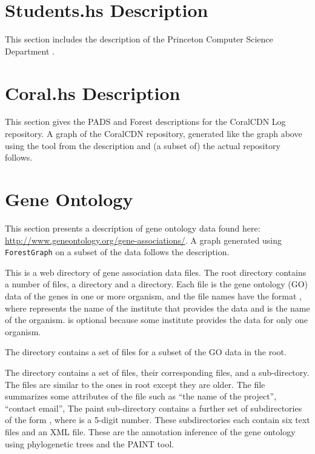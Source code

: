 \section{Students.hs Description}
This section includes the \forest{} description of the Princeton
Computer Science Department \filestore{}.


\newpage

\section{Coral.hs Description}

This section gives the PADS and Forest descriptions for the CoralCDN
Log repository. A graph of the CoralCDN
repository, generated like the graph above using the 
tool from the description and (a subset of) the actual repository 
follows.



\newpage

\section{Gene Ontology}

This section presents a description of gene ontology data found 
here: \url{http://www.geneontology.org/gene-associations/}.
A graph generated using \texttt{ForestGraph}
on a subset of the data follows the description.

This \filestore{} is a web directory of gene association data files.
The root directory contains a number of  files,
a  directory and a  directory.
Each  file is the gene ontology (GO) data of the genes
in one or more organism, and the file names have the format
, where  represents the
name of the institute that provides the data and  is the
name of the organism.  is optional because some institute
provides the data for only one organism.

The  directory contains a set of  files for a
subset of the GO data in the root.

The  directory contains a set of  files, their
corresponding  files, and a  sub-directory.
The  files are similar to the ones
in root except they are older. The  file summarizes
some attributes of the  file such as ``the name of the project'',
``contact email'', \etc{} The paint sub-directory contains
a further set of subdirectories of the form , where
 is a 5-digit number. These subdirectories each contain
six text files and an XML file. These are the annotation inference
of the gene ontology using phylogenetic trees and the PAINT tool.


